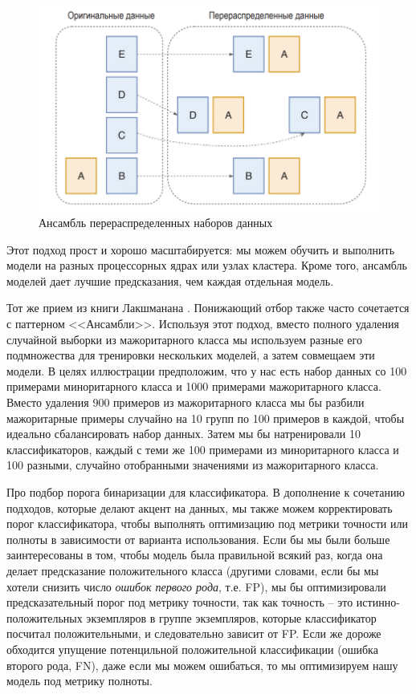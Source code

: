 \documentclass[%
	11pt,
	a4paper,
	utf8,
		]{article}
\begin{document}
\begin{figure}[h]
	\centering
	\includegraphics[scale=0.6]{figures/imbalanced_h4.png}
	\caption{ Ансамбль перераспределенных наборов данных }\label{fig:imbalanced_h4}
\end{figure}

Этот подход прост и хорошо масштабируется: мы можем обучить и выполнить модели на разных процессорных ядрах или узлах кластера. Кроме того, ансамбль моделей дает лучшие предсказания, чем каждая отдельная модель.

Тот же прием из книги Лакшманана \cite[]{lakshmanan-mldp:2022}. Понижающий отбор также часто сочетается с паттерном <<Ансамбли>>. Используя этот подход, вместо полного удаления случайной выборки из мажоритарного класса мы используем разные его подмножества для тренировки нескольких моделей, а затем совмещаем эти модели. В целях иллюстрации предположим, что у нас есть набор данных со 100 примерами миноритарного класса и 1000 примерами мажоритарного класса. Вместо удаления 900 примеров из мажоритарного класса мы бы разбили мажоритарные примеры случайно на 10 групп по 100 примеров в каждой, чтобы идеально сбалансировать набор данных. Затем мы бы натренировали 10 классификаторов, каждый с теми же 100 примерами из миноритарного класса и 100 разными, случайно отобранными значениями из мажоритарного класса.

Про подбор порога бинаризации для классификатора. В дополнение к сочетанию подходов, которые делают акцент на данных, мы также можем корректировать порог классификатора, чтобы выполнять оптимизацию под метрики точности или полноты в зависимости от варианта использования. Если бы мы были больше заинтересованы в том, чтобы модель была правильной всякий раз, когда она делает предсказание положительного класса (другими словами, если бы мы хотели снизить число \emph{ошибок первого рода}, т.е. FP), мы бы оптимизировали предсказательный порог под метрику точности, так как точность -- это истинно-положительных экземпляров в группе экземпляров, которые классификатор посчитал положительными, и следовательно зависит от FP. Если же дороже обходится упущение потенцильной положительной классификации (ошибка второго рода, FN), даже если мы можем ошибаться, то мы оптимизируем нашу модель под метрику полноты.
\end{document}
